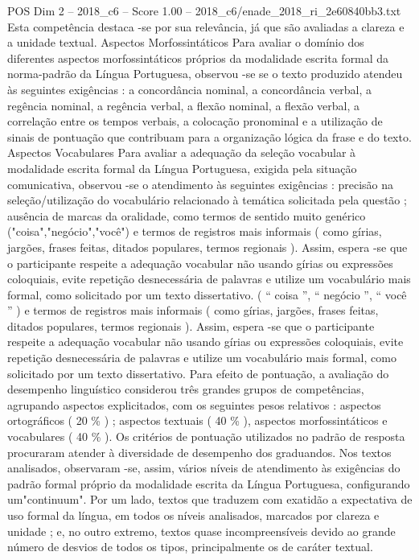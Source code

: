 \begin{textsample}{POS Dim 2 – 2018\_c6 – Score 1.00 – 2018\_c6/enade\_2018\_ri\_2e60840bb3.txt}
Esta competência destaca -se por sua relevância, já que são avaliadas a clareza e a unidade textual.
Aspectos Morfossintáticos Para avaliar o domínio dos diferentes aspectos morfossintáticos próprios da modalidade escrita formal da norma-padrão da Língua Portuguesa, observou -se se o texto produzido atendeu às seguintes exigências : a concordância nominal, a concordância verbal, a regência nominal, a regência verbal, a flexão nominal, a flexão verbal, a correlação entre os tempos verbais, a colocação pronominal e a utilização de sinais de pontuação que contribuam para a organização lógica da frase e do texto.
Aspectos Vocabulares Para avaliar a adequação da seleção vocabular à modalidade escrita formal da Língua Portuguesa, exigida pela situação comunicativa, observou -se o atendimento às seguintes exigências : precisão na seleção/utilização do vocabulário relacionado à temática solicitada pela questão ; ausência de marcas da oralidade, como termos de sentido muito genérico ("coisa","negócio","você") e termos de registros mais informais ( como gírias, jargões, frases feitas, ditados populares, termos regionais ).
Assim, espera -se que o participante respeite a adequação vocabular não usando gírias ou expressões coloquiais, evite repetição desnecessária de palavras e utilize um vocabulário mais formal, como solicitado por um texto dissertativo. ( “ coisa ”, “ negócio ”, “ você ” ) e termos de registros mais informais ( como gírias, jargões, frases feitas, ditados populares, termos regionais ).
Assim, espera -se que o participante respeite a adequação vocabular não usando gírias ou expressões coloquiais, evite repetição desnecessária de palavras e utilize um vocabulário mais formal, como solicitado por um texto dissertativo.
Para efeito de pontuação, a avaliação do desempenho linguístico considerou três grandes grupos de competências, agrupando aspectos explicitados, com os seguintes pesos relativos : aspectos ortográficos ( 20 \% ) ; aspectos textuais ( 40 \% ), aspectos morfossintáticos e vocabulares ( 40 \% ).
Os critérios de pontuação utilizados no padrão de resposta procuraram atender à diversidade de desempenho dos graduandos.
Nos textos analisados, observaram -se, assim, vários níveis de atendimento às exigências do padrão formal próprio da modalidade escrita da Língua Portuguesa, configurando um"continuum".
Por um lado, textos que traduzem com exatidão a expectativa de uso formal da língua, em todos os níveis analisados, marcados por clareza e unidade ; e, no outro extremo, textos quase incompreensíveis devido ao grande número de desvios de todos os tipos, principalmente os de caráter textual.

\end{textsample}
